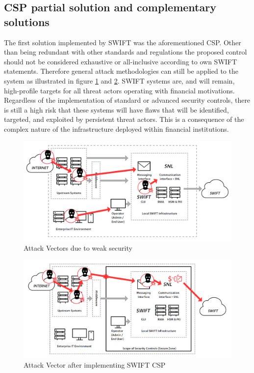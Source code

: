 \documentclass[12pt]{article}
\begin{document}
        \subsection{CSP partial solution and complementary solutions}
        The first solution implemented by SWIFT was the aforementioned CSP. Other than being redundant with other standards and regulations the proposed control should not be considered exhaustive or all-inclusive according to own SWIFT statements. 
        Therefore general attack methodologies can still be applied to the system as illustrated in figure \ref{fig:before} and \ref{fig:after}. SWIFT systems are, and will remain, high-profile targets for all threat actors operating with financial motivations. Regardless of the implementation of standard or advanced security controls, there is still a high risk that these systems will have flaws that will be identified, targeted, and exploited by persistent threat actors. This is a consequence of the complex nature of the infrastructure deployed within financial institutions.
        
        \begin{figure}[H]
        \centering
        \includegraphics[width=\textwidth,cfbox=red 0.1mm 0.1mm]{figures/before.png}
        \caption{Attack Vectors due to weak security}
        \label{fig:before}
        \end{figure}
        
        \begin{figure}[H]
        \centering
        \includegraphics[width=\textwidth,cfbox=red 0.1mm 0.1mm]{figures/after.png}
        \caption{Attack Vector after implementing SWIFT CSP}
        \label{fig:after}
        \end{figure}
        
\end{document}
